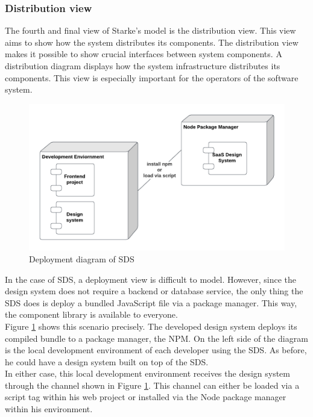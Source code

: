 \subsubsection{Distribution view}
The fourth and final view of Starke's model is the distribution view. This view aims to show how the system distributes its components. The distribution view makes it possible to show crucial interfaces between system components. A distribution diagram displays how the system infrastructure distributes its components. This view is especially important for the operators of the software system. \cite{starke_effektive_2020} \\
\begin{figure}[htbp]
    \centerline{
    \includegraphics[width=\linewidth]{images/deployment_diagram_sds.png}}
\caption{Deployment diagram of \ac{SDS}}
\label{deployment_diagram_sds}
\end{figure}
In the case of SDS, a deployment view is difficult to model. However, since the design system does not require a backend or database service, the only thing the SDS does is deploy a bundled JavaScript file via a package manager. This way, the component library is available to everyone. \\
Figure \ref{deployment_diagram_sds} shows this scenario precisely. The developed design system deploys its compiled bundle to a package manager, the \ac{NPM}. On the left side of the diagram is the local development environment of each developer using the \ac{SDS}. As before, he could have a design system built on top of the \ac{SDS}. \\
In either case, this local development environment receives the design system through the channel shown in Figure \ref{deployment_diagram_sds}. This channel can either be loaded via a script tag within his web project or installed via the Node package manager within his environment.  